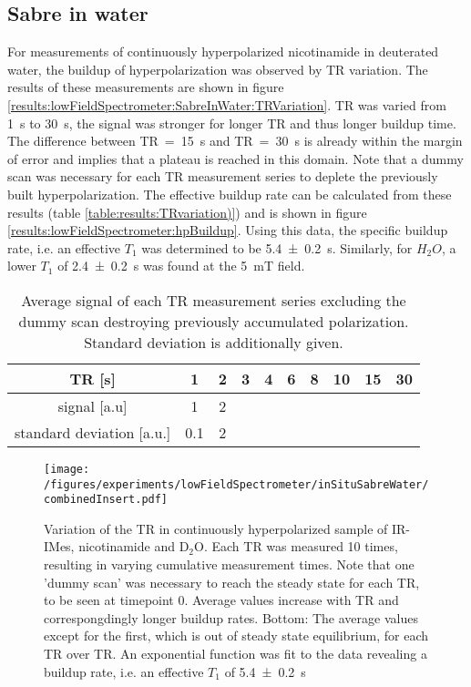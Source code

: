     \subsection{Sabre in water}
    For measurements of continuously hyperpolarized nicotinamide in deuterated water, the buildup of hyperpolarization was observed by TR variation. The results of these measurements are shown in figure \ref{results:lowFieldSpectrometer:SabreInWater:TRVariation}. TR was varied from \SI{1}{\second} to \SI{30}{\second}, the signal was stronger for longer TR and thus longer buildup time. The difference between TR~=~\SI{15}{\second} and TR~=~\SI{30}{\second} is already within the margin of error and implies that a plateau is reached in this domain. Note that a dummy scan was necessary for each TR measurement series to deplete the previously built hyperpolarization. The effective buildup rate can be calculated from these results (table \ref{table:results:TRvariation)}) and is shown in figure \ref{results:lowFieldSpectrometer:hpBuildup}. Using this data, the specific buildup rate, i.e. an effective $T_1$ was determined to be \SI{5.4\pm 0.2}{\second}. Similarly, for $H_2O$, a lower $T_1$ of \SI{2.4\pm0.2}{\second} was found at the \SI{5}{\milli\tesla} field.
        \begin{table}
            \centering
            \begin{tabular}{|c|ccccccccc|}
                \hline
                TR [s] & 1 & 2 & 3 & 4 & 6 & 8 & 10 & 15 & 30 \\
                \hline
                signal [a.u] & 1 & 2\\
                standard deviation [a.u.] & 0.1 & 2\\
                \hline
            \end{tabular}
            \label{table:results:TRvariation}
            \caption[TR-variation results]{Average signal of each TR measurement series excluding the dummy scan destroying previously accumulated polarization. Standard deviation is additionally given.}
        \end{table}
        \begin{figure}
            \texttt{[image: /figures/experiments/lowFieldSpectrometer/inSituSabreWater/combinedInsert.pdf]}
            \caption[TR variation]{Variation of the TR in continuously hyperpolarized sample of IR-IMes, nicotinamide and D$_2$O. Each TR was measured 10 times, resulting in varying cumulative measurement times. Note that one 'dummy scan' was necessary to reach the steady state for each TR, to be seen at timepoint 0. Average values increase with TR and correspongdingly longer buildup rates. Bottom: The average values except for the first, which is out of steady state equilibrium, for each TR over TR. An exponential function was fit to the data revealing a buildup rate, i.e. an effective $T_1$ of \SI{5.4\pm 0.2}{\second}}
        \end{figure}
